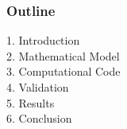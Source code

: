 
\maketitle

\begin{frame}
 \frametitle{Outline}
  \vspace{-1cm}
  1. Introduction\\[0.1cm]
  2. Mathematical Model\\[0.1cm]
  3. Computational Code\\[0.1cm]
  4. Validation\\[0.1cm]
  5. Results\\[0.1cm]
  6. Conclusion
\end{frame}



